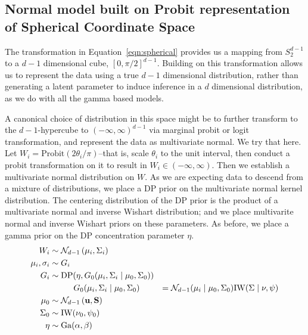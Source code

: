 
\subsection{Normal model built on Probit representation of Spherical Coordinate Space}
\label{method:npprobitnorm}
The transformation in Equation~\ref{eqn:spherical} provides us a mapping from $S_{2}^{d-1}$ to a
  $d-1$ dimensional cube, $[0, \pi/2]^{d-1}$.  Building on this transformation allows us to represent
  the data using a true $d-1$ dimensional distribution, rather than generating a latent parameter
  to induce inference in a $d$ dimensional distribution, as we do with all the gamma based models.

A canonical choice of distribution in this space might be to further transform to the $d-1$-hypercube
  to $(-\infty, \infty)^{d-1}$ via marginal probit or logit transformation, and represent the data as
  multivariate normal.  We try that here.  Let $W_i = \text{Probit}(2\theta_i /\pi)$--that is,
  scale $\theta_i$ to the unit interval, then conduct a probit transformation on it to result in
  $W_i \in (-\infty, \infty)$.  Then we establish a multivariate normal distribution on $W$. As we
  are expecting data to descend from a mixture of distributions, we place a DP prior on the multivariate
  normal kernel distribution.  The centering distribution of the DP prior is the product of a
  multivariate normal and inverse Wishart distribution; and we place multivarite normal and inverse
  Wishart priors on these parameters.  As before, we place a gamma prior on the DP concentration
  parameter $\eta$.
  \begin{equation}
    \begin{aligned}
                W_i &\sim \mathcal{N}_{d-1}\left(\mu_i, \Sigma_i\right)\\
    \mu_i, \sigma_i &\sim G_i\\
                G_i &\sim \text{DP}(\eta, G_0(\mu_i,\Sigma_i\mid\mu_0,\Sigma_0))\\
                    &\hspace{1cm}G_0(\mu_i,\Sigma_i\mid\mu_0,\Sigma_0) &=
                      \mathcal{N}_{d-1}(\mu_i\mid\mu_0,\Sigma_0)\text{IW}(\Sigma\mid\nu,\psi)\\
              \mu_0 &\sim \mathcal{N}_{d-1}\left({\bf u},{\bf S}\right)\\
           \Sigma_0 &\sim \text{IW}(\nu_0,\psi_0)\\
               \eta &\sim \text{Ga}(\alpha, \beta)
    \end{aligned}
  \end{equation}

